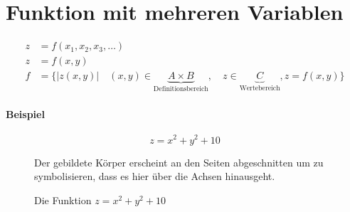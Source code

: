 \section{Funktion mit mehreren Variablen}

\begin{align*}
    z &= f (x_1, x_2, x_3, \ldots) \\
    z &= f (x, y) \\
    f &= \{ \lvert z (x, y) \rvert \quad (x, y) \in \underbrace{A \times B}_{\text{Definitionsbereich}},\quad z \in \underbrace{C}_{\text{Wertebereich}}, z = f(x, y) \}
\end{align*}

\paragraph{Beispiel}

\[
    z = x^2 + y^2 + 10
\]

\begin{figure}[H]
    \centering
    
    \caption{Die Funktion \(z = x^2 + y^2 + 10\)}
    Der gebildete Körper erscheint an den Seiten abgeschnitten um zu symbolisieren, dass es hier über die Achsen hinausgeht.
\end{figure}



